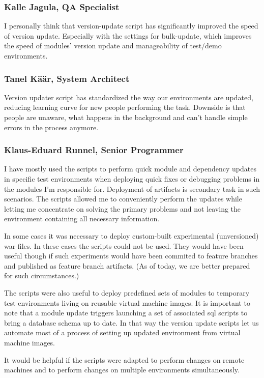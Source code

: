 \documentclass[12pt]{report}
\begin{document}
  \subsubsection{Kalle Jagula, QA Specialist}
  
  \begin{displayquote}
  I personally think that version-update script has significantly improved the speed of version update. Especially with the settings for bulk-update, which improves the speed of modules' version update and manageability of test/demo environments.
  \end{displayquote}
  
  \subsubsection{Tanel Käär, System Architect}
  
  \begin{displayquote}
  Version updater script has standardized the way our environments are updated, reducing learning curve for new people performing the task. Downside is that people are unaware, what happens in the background and can't handle simple errors in the process anymore.
  \end{displayquote}
  
  \subsubsection{Klaus-Eduard Runnel, Senior Programmer}
  
  \begin{displayquote}
  I have mostly used the scripts to perform quick module and dependency updates in specific test environments when deploying quick fixes or debugging problems in the modules I'm responsible for. Deployment of artifacts is secondary task in such scenarios. The scripts allowed me to conveniently perform the updates while letting me concentrate on solving the primary problems and not leaving the environment containing all necessary information.

In some cases it was necessary to deploy custom-built experimental (unversioned) war-files. In these cases the scripts could not be used.
They would have been useful though if such experiments would have been commited to feature branches and published as feature branch artifacts. (As of today, we are better prepared for such circumstances.)

The scripts were also useful to deploy predefined sets of modules to temporary test environments living on reusable virtual machine images. It is important to note that a module update triggers launching a set of associated sql scripts to bring a database schema up to date. In that way the version update scripts let us automate most of a process of setting up updated environment from virtual machine images.

It would be helpful if the scripts were adapted to perform changes on remote machines and to perform changes on multiple environments simultaneously.
  \end{displayquote}
\end{document}
